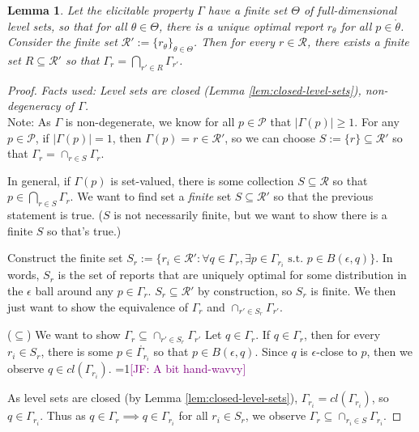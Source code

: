 \documentclass[12pt]{article}
\newcommand{\Comments}{1}
\newcommand{\mynote}[2]{\ifnum\Comments=1\textcolor{#1}{#2}\fi}
\newcommand{\jessie}[1]{\mynote{purple}{[JF: #1]}}
\renewcommand{\P}{\mathcal{P}}
\newcommand{\R}{\mathcal{R}}
\newcommand{\inter}[1]{\mathring{#1}}%
\newtheorem{lemma}{Lemma}
\begin{document}
\begin{lemma}\label{lem:intersect-lev-sets}
  Let the elicitable property $\Gamma$ have a finite set $\Theta$ of full-dimensional level sets, so that for all $\theta \in \Theta$,  there is a unique optimal report $r_\theta$ for all $p \in \inter{\theta}$.
  Consider the finite set $\R' := \{ r_\theta\}_{\theta \in \Theta}$.
  Then for every $r \in \R$, there exists a finite set $R \subseteq \R'$ so that $\Gamma_r = \bigcap_{r' \in R} \Gamma_{r'}$.
\end{lemma}
\begin{proof}
  \emph{Facts used: Level sets are closed (Lemma \ref{lem:closed-level-sets}), non-degeneracy of $\Gamma$.}\\

  Note:    As $\Gamma$ is non-degenerate, we know for all $p \in \P$ that $|\Gamma(p)| \geq 1$.
  For any $p \in \P$, if $|\Gamma(p)| = 1$, then $\Gamma(p) = r \in \R'$, so we can choose $S := \{r\} \subseteq \R'$ so that $\Gamma_r = \cap_{r \in S} \Gamma_r$.
  
  In general, if $\Gamma(p)$ is set-valued, there is some collection $S \subseteq \R$ so that $p \in \bigcap_{r \in S} \Gamma_r$.
  We want to find set a \emph{finite} set $S \subseteq \R'$ so that the previous statement is true.
  ($S$ is not necessarily finite, but we want to show there is a finite $S$ so that's true.)

Construct the finite set $S_r := \{ r_i \in \R' : \forall q \in \Gamma_{r}, \exists p \in \Gamma_{r_i} \text{ s.t. } p \in B(\epsilon, q) \}$.
In words, $S_r$ is the set of reports that are uniquely optimal for some distribution in the $\epsilon$ ball around any $p \in \Gamma_r$.
$S_r \subseteq \R'$ by construction, so $S_r$ is finite. 
We then just want to show the equivalence of $\Gamma_r$ and $\cap_{r' \in S_r}\Gamma_{r'}$.

($\subseteq$)  We want to show $\Gamma_r \subseteq \cap_{r' \in S_r}\Gamma_{r'}$
Let $q \in \Gamma_r$.
If $q \in \Gamma_r$, then for every $r_i \in S_r$, there is some $p \in \inter{\Gamma_{r_i}}$ so that $p \in B(\epsilon, q)$.
Since $q$ is $\epsilon$-close to $p$, then we observe $q \in cl(\Gamma_{r_i})$.
\jessie{A bit hand-wavvy}

As level sets are closed (by Lemma \ref{lem:closed-level-sets}), $\Gamma_{r_i} = cl(\Gamma_{r_i})$, so $q \in \Gamma_{r_i}$.
Thus as $q \in \Gamma_r \implies q \in \Gamma_{r_i}$ for all $r_i \in S_r$, we observe $\Gamma_r \subseteq \cap_{r_i \in S}\Gamma_{r_i}$.


\end{proof}
\end{document}
